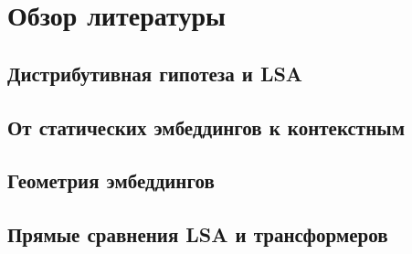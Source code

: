 \section{Обзор литературы}
\label{sec:related-work}


\subsection{Дистрибутивная гипотеза и LSA}
\label{ssec:rw-lsa}


\subsection{От статических эмбеддингов к контекстным}
\label{ssec:rw-contextual}


\subsection{Геометрия эмбеддингов}
\label{ssec:rw-geometry}


\subsection{Прямые сравнения LSA и трансформеров}
\label{ssec:rw-comparisons}

